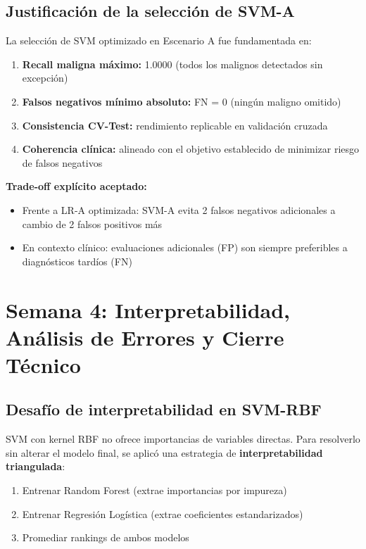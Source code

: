\documentclass[11pt,a4paper]{article}
\begin{document}
\subsection{Justificación de la selección de SVM-A}

La selección de SVM optimizado en Escenario A fue fundamentada en:

\begin{enumerate}[leftmargin=1.4cm]
\item \textbf{Recall maligna máximo:} 1.0000 (todos los malignos detectados sin excepción)
\item \textbf{Falsos negativos mínimo absoluto:} FN = 0 (ningún maligno omitido)
\item \textbf{Consistencia CV-Test:} rendimiento replicable en validación cruzada
\item \textbf{Coherencia clínica:} alineado con el objetivo establecido de minimizar riesgo de falsos negativos
\end{enumerate}

\textbf{Trade-off explícito aceptado:}
\begin{itemize}[leftmargin=1.4cm]
\item Frente a LR-A optimizada: SVM-A evita 2 falsos negativos adicionales a cambio de 2 falsos positivos más
\item En contexto clínico: evaluaciones adicionales (FP) son siempre preferibles a diagnósticos tardíos (FN)
\end{itemize}

\section{Semana 4: Interpretabilidad, Análisis de Errores y Cierre Técnico}

\subsection{Desafío de interpretabilidad en SVM-RBF}

SVM con kernel RBF no ofrece importancias de variables directas. Para resolverlo sin alterar el modelo final, se aplicó una estrategia de \textbf{interpretabilidad triangulada}:

\begin{enumerate}[leftmargin=1.4cm]
\item Entrenar Random Forest (extrae importancias por impureza)
\item Entrenar Regresión Logística (extrae coeficientes estandarizados)
\item Promediar rankings de ambos modelos
\end{enumerate}
\end{document}
